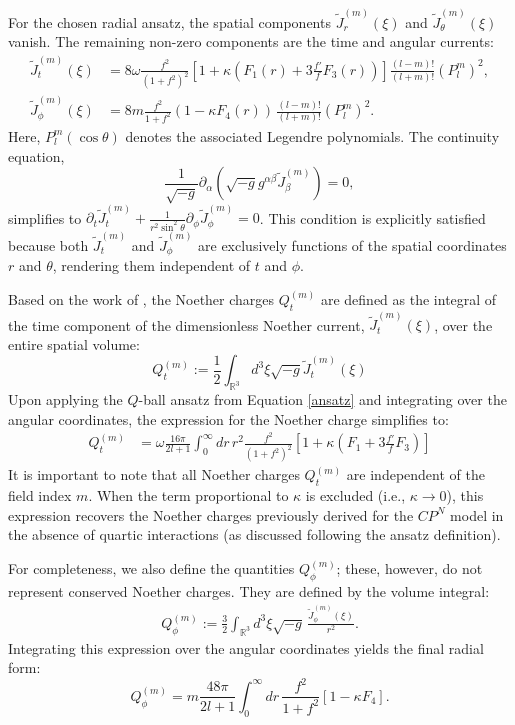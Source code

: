 \documentclass[aps,prd,superscriptaddress,notitlepage,11pt,final,longbibliography,nofootinbib]{revtex4-1}
\newcommand{\be}{\begin{equation}}
\newcommand{\ee}{\end{equation}}
\numberwithin{equation}{section}
\begin{document}
For the chosen radial ansatz, the spatial components $\widetilde{J}_{r}^{(m)}(\xi)$ and $\widetilde{J}_{\theta}^{(m)}(\xi)$ vanish. The remaining non-zero components are the time and angular currents:
\begin{align}
\widetilde J_{t}^{(m)}(\xi)&=8\omega\frac{f^2}{(1+f^2)^2}\left[1+\kappa\left(F_1(r)+3\frac{f'}{f}F_3(r)\right)\right]\frac{(l-m)!}{(l+m)!}(P^m_l)^2,\\
\widetilde J_{\phi}^{(m)}(\xi)&=8m\frac{f^2}{1+f^2}(1-\kappa F_4(r))\,\frac{(l-m)!}{(l+m)!}(P^m_l)^2.
\end{align}
Here, $P^m_l(\cos\theta)$ denotes the associated Legendre polynomials. The continuity equation, 
$$\frac{1}{\sqrt{-g}}\partial_{\alpha}(\sqrt{-g}g^{\alpha\beta}\widetilde{J}_{\beta}^{(m)})=0,$$ simplifies to $\partial_t\widetilde{J}_{t}^{(m)}+\frac{1}{r^2\sin^2\theta}\partial_{\phi}\tilde{J}_{\phi}^{(m)}=0$. This condition is explicitly satisfied because both $\widetilde{J}_{t}^{(m)}$ and $\widetilde{J}_{\phi}^{(m)}$ are exclusively functions of the spatial coordinates $r$ and $\theta$, rendering them independent of $t$ and $\phi$.

Based on the work of \cite{Klimas:2017eft}, the Noether charges $Q_t^{(m)}$ are defined as the integral of the time component of the dimensionless Noether current, $\widetilde{J}_t^{(m)}(\xi)$, over the entire spatial volume:
\be
Q_t^{(m)}:=\frac{1}{2}\int_{{\mathbb{R}}^3}d^3\xi\sqrt{-g}\widetilde J^{(m)}_t(\xi)
\ee
Upon applying the ${Q}$-ball ansatz from Equation \eqref{ansatz} and integrating over the angular coordinates, the expression for the Noether charge simplifies to:
{\small
\begin{align}
Q_t^{(m)}&=\omega\frac{16\pi}{2l+1}\int_0^{\infty}dr\, r^2\frac{f^2}{(1+f^2)^2}\left[1+\kappa\left(F_1+3\frac{f'}{f}F_3\right)\right]\label{Qt}
\end{align}}
It is important to note that all Noether charges $Q_t^{(m)}$ are independent of the field index $m$. When the term proportional to $\kappa$ is excluded (i.e., $\kappa \to 0$), this expression recovers the Noether charges previously derived for the ${C}P^N$ model in the absence of quartic interactions (as discussed following the ansatz definition).


For completeness, we also define the quantities $Q_{\phi}^{(m)}$; these, however, do not represent conserved Noether charges. They are defined by the volume integral:
\begin{align*}
Q_\phi^{(m)}:=\frac{3}{2}\int_{{\mathbb{R}}^3}d^3\xi\sqrt{-g}\,\frac{\widetilde J^{(m)}_\phi(\xi)}{r^2}.
\end{align*}
Integrating this expression over the angular coordinates yields the final radial form:
\be
Q_\phi^{(m)}=m\frac{48\pi}{2l+1}\int_0^{\infty}dr\,\frac{f^2}{1+f^2}\left[1-\kappa F_4\right].\label{Qphi}
\ee
\end{document}
